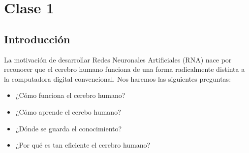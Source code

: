 \section{Clase 1}
\subsection{Introducción}

La motivación de desarrollar Redes Neuronales Artificiales (RNA) nace por reconocer que el cerebro humano funciona de una forma radicalmente distinta a la computadora digital convencional. Nos haremos las siguientes preguntas:

\begin{itemize}
    \item ¿Cómo funciona el cerebro humano?
    \item ¿Cómo aprende el cerebo humano?
    \item ¿Dónde se guarda el conocimiento?
    \item ¿Por qué es tan eficiente el cerebro humano?
\end{itemize}